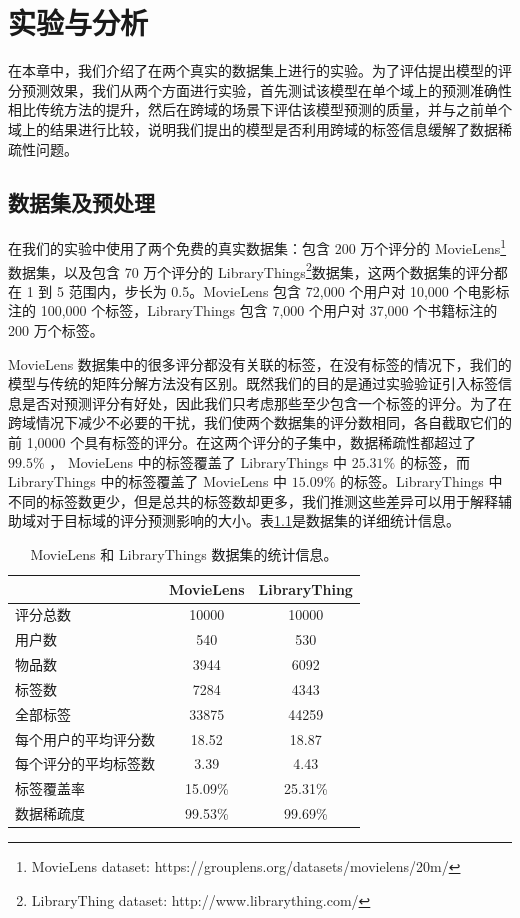 \chapter{实验与分析}
在本章中，我们介绍了在两个真实的数据集上进行的实验。为了评估提出模型的评分预测效果，我们从两个方面进行实验，首先测试该模型在单个域上的预测准确性相比传统方法的提升，然后在跨域的场景下评估该模型预测的质量，并与之前单个域上的结果进行比较，说明我们提出的模型是否利用跨域的标签信息缓解了数据稀疏性问题。

\section{数据集及预处理}
在我们的实验中使用了两个免费的真实数据集：包含 $200$ 万个评分的 MovieLens\footnote{MovieLens dataset: https://grouplens.org/datasets/movielens/20m/}  数据集，以及包含 70 万个评分的 LibraryThings\footnote{LibraryThing dataset: http://www.librarything.com/}数据集，这两个数据集的评分都在 1 到 5 范围内，步长为 0.5。MovieLens 包含 72,000 个用户对 10,000 个电影标注的 100,000 个标签，LibraryThings 包含 7,000 个用户对 37,000 个书籍标注的 200 万个标签。


MovieLens 数据集中的很多评分都没有关联的标签，在没有标签的情况下，我们的模型与传统的矩阵分解方法没有区别。既然我们的目的是通过实验验证引入标签信息是否对预测评分有好处，因此我们只考虑那些至少包含一个标签的评分。为了在跨域情况下减少不必要的干扰，我们使两个数据集的评分数相同，各自截取它们的前 1,0000 个具有标签的评分。在这两个评分的子集中，数据稀疏性都超过了 $99.5\%$ ， MovieLens 中的标签覆盖了 LibraryThings 中 $25.31\%$ 的标签，而 LibraryThings 中的标签覆盖了 MovieLens 中 $15.09\%$ 的标签。LibraryThings 中不同的标签数更少，但是总共的标签数却更多，我们推测这些差异可以用于解释辅助域对于目标域的评分预测影响的大小。表\ref{dataset_feature}是数据集的详细统计信息。

\begin{table}[htbp]
\centering
\caption{MovieLens 和 LibraryThings 数据集的统计信息。}
\label{dataset_feature}
\begin{tabular}{|l|c|c|}
\hline
\rowcolor[HTML]{EFEFEF} 
           & MovieLens & LibraryThing \\ \hline
评分总数       & 10000     & 10000        \\ \hline
用户数        & 540       & 530          \\ \hline
物品数        & 3944      & 6092         \\ \hline
标签数        & 7284      & 4343         \\ \hline
全部标签       & 33875     & 44259        \\ \hline
每个用户的平均评分数 & 18.52     & 18.87        \\ \hline
每个评分的平均标签数 & 3.39      & 4.43         \\ \hline
标签覆盖率      & 15.09\%   & 25.31\%      \\ \hline
数据稀疏度      & 99.53\%   & 99.69\%      \\ \hline
\end{tabular}
\end{table}

